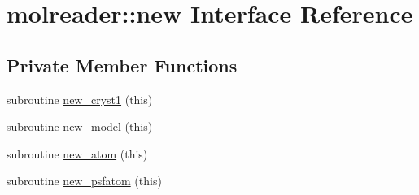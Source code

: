 \hypertarget{interfacemolreader_1_1new}{\section{molreader\+:\+:new Interface Reference}
\label{interfacemolreader_1_1new}
}
\subsection*{Private Member Functions}
\begin{DoxyCompactItemize}
\item 
subroutine \hyperlink{interfacemolreader_1_1new_ad81ee1b9d12963227f168d144524de7c}{new\+\_\+cryst1} (this)
\item 
subroutine \hyperlink{interfacemolreader_1_1new_ac306717f3be718d382c6b9c38ade70bb}{new\+\_\+model} (this)
\item 
subroutine \hyperlink{interfacemolreader_1_1new_a45405dac2693a9b5fbe3f6a62707395b}{new\+\_\+atom} (this)
\item 
subroutine \hyperlink{interfacemolreader_1_1new_a61dff60bac414a094a6a1082f3a63296}{new\+\_\+psfatom} (this)
\end{DoxyCompactItemize}


